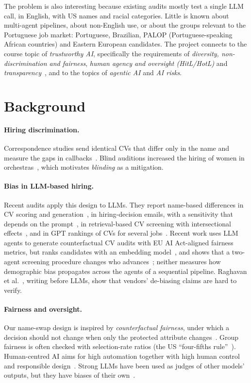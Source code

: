 \documentclass{article}
\begin{document}
The problem is also interesting because existing audits mostly test a single LLM call, in English, with US names and racial categories. Little is known about multi-agent pipelines, about non-English use, or about the groups relevant to the Portuguese job market: Portuguese, Brazilian, PALOP (Portuguese-speaking African countries) and Eastern European candidates. The project connects to the course topic of \emph{trustworthy AI}, specifically the requirements of \emph{diversity, non-discrimination and fairness}, \emph{human agency and oversight (HitL/HotL)} and \emph{transparency}~\cite{hleg2019ethics}, and to the topics of \emph{agentic AI} and \emph{AI risks}.

\section{Background}

\paragraph{Hiring discrimination.} Correspondence studies send identical CVs that differ only in the name and measure the gaps in callbacks~\cite{bertrand2004emily}. Blind auditions increased the hiring of women in orchestras~\cite{goldin2000orchestrating}, which motivates \emph{blinding} as a mitigation.

\paragraph{Bias in LLM-based hiring.} Recent audits apply this design to LLMs. They report name-based differences in CV scoring and generation~\cite{armstrong2024silicon}, in hiring-decision emails, with a sensitivity that depends on the prompt~\cite{an2024discriminate}, in retrieval-based CV screening with intersectional effects~\cite{wilson2024resume}, and in GPT rankings of CVs for several jobs~\cite{yin2024bloomberg}. Recent work uses LLM agents to generate counterfactual CV audits with EU AI Act-aligned fairness metrics, but ranks candidates with an embedding model~\cite{yashwant2026counterfactual}, and shows that a two-agent screening procedure changes who advances~\cite{gao2026agent}; neither measures how demographic bias propagates across the agents of a sequential pipeline. Raghavan et al.~, writing before LLMs, show that vendors' de-biasing claims are hard to verify.

\paragraph{Fairness and oversight.} Our name-swap design is inspired by \emph{counterfactual fairness}, under which a decision should not change when only the protected attribute changes~\cite{kusner2017counterfactual}. Group fairness is often checked with selection-rate ratios (the US ``four-fifths rule''~\cite{eeoc1978uniform}). Human-centred AI aims for high automation together with high human control~\cite{shneiderman2022hcai} and responsible design~\cite{dignum2019responsible}. Strong LLMs have been used as judges of other models' outputs, but they have biases of their own~\cite{zheng2023judging}.
\end{document}
